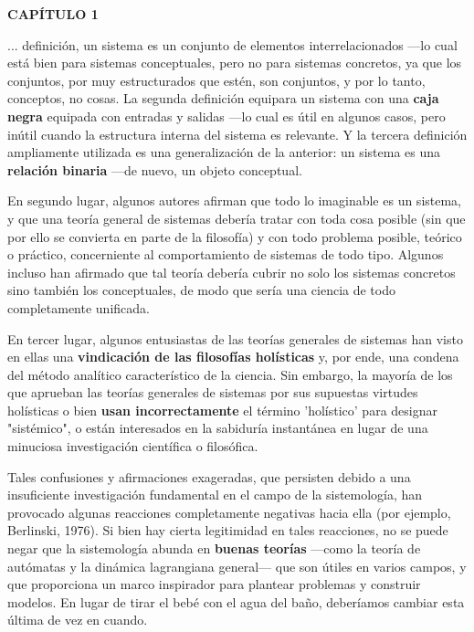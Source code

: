 \newpage
\fancyhf{}
\fancyhead[l]{\thepage} 
\begin{center}
{\fontsize{16}{18}\selectfont \textbf{CAPÍTULO 1}}
\end{center}
\vspace{0.5cm}

{\fontsize{13}{15}\selectfont
... definición, un sistema es un conjunto de elementos interrelacionados —lo cual está bien para sistemas conceptuales, pero no para sistemas concretos, ya que los conjuntos, por muy estructurados que estén, son conjuntos, y por lo tanto, conceptos, no cosas. La segunda definición equipara un sistema con una \textbf{caja negra} equipada con entradas y salidas —lo cual es útil en algunos casos, pero inútil cuando la estructura interna del sistema es relevante. Y la tercera definición ampliamente utilizada es una generalización de la anterior: un sistema es una \textbf{relación binaria} —de nuevo, un objeto conceptual.

En segundo lugar, algunos autores afirman que todo lo imaginable es un sistema, y que una teoría general de sistemas debería tratar con toda cosa posible (sin que por ello se convierta en parte de la filosofía) y con todo problema posible, teórico o práctico, concerniente al comportamiento de sistemas de todo tipo. Algunos incluso han afirmado que tal teoría debería cubrir no solo los sistemas concretos sino también los conceptuales, de modo que sería una ciencia de todo completamente unificada.

En tercer lugar, algunos entusiastas de las teorías generales de sistemas han visto en ellas una \textbf{vindicación de las filosofías holísticas} y, por ende, una condena del método analítico característico de la ciencia. Sin embargo, la mayoría de los que aprueban las teorías generales de sistemas por sus supuestas virtudes holísticas o bien \textbf{usan incorrectamente} el término 'holístico' para designar "sistémico", o están interesados en la sabiduría instantánea en lugar de una minuciosa investigación científica o filosófica.

Tales confusiones y afirmaciones exageradas, que persisten debido a una insuficiente investigación fundamental en el campo de la sistemología, han provocado algunas reacciones completamente negativas hacia ella (por ejemplo, Berlinski, 1976). Si bien hay cierta legitimidad en tales reacciones, no se puede negar que la sistemología abunda en \textbf{buenas teorías} —como la teoría de autómatas y la dinámica lagrangiana general— que son útiles en varios campos, y que proporciona un marco inspirador para plantear problemas y construir modelos. En lugar de tirar el bebé con el agua del baño, deberíamos cambiar esta última de vez en cuando.

}
